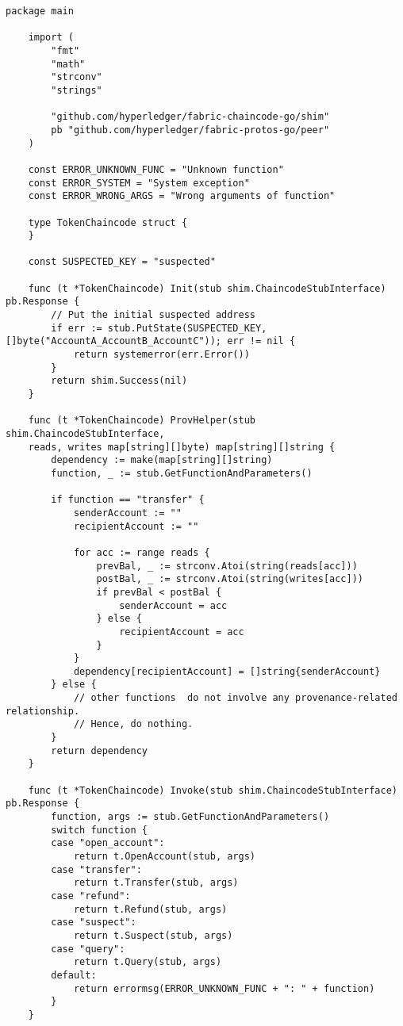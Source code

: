 \begin{lstlisting}
package main

    import (
        "fmt"
        "math"
        "strconv"
        "strings"
    
        "github.com/hyperledger/fabric-chaincode-go/shim"
        pb "github.com/hyperledger/fabric-protos-go/peer"
    )
    
    const ERROR_UNKNOWN_FUNC = "Unknown function"
    const ERROR_SYSTEM = "System exception"
    const ERROR_WRONG_ARGS = "Wrong arguments of function"
    
    type TokenChaincode struct {
    }
    
    const SUSPECTED_KEY = "suspected"
    
    func (t *TokenChaincode) Init(stub shim.ChaincodeStubInterface) pb.Response {
        // Put the initial suspected address
        if err := stub.PutState(SUSPECTED_KEY, []byte("AccountA_AccountB_AccountC")); err != nil {
            return systemerror(err.Error())
        }
        return shim.Success(nil)
    }
    
    func (t *TokenChaincode) ProvHelper(stub shim.ChaincodeStubInterface, 
    reads, writes map[string][]byte) map[string][]string {
        dependency := make(map[string][]string)
        function, _ := stub.GetFunctionAndParameters()
    
        if function == "transfer" {
            senderAccount := ""
            recipientAccount := ""
    
            for acc := range reads {
                prevBal, _ := strconv.Atoi(string(reads[acc]))
                postBal, _ := strconv.Atoi(string(writes[acc]))
                if prevBal < postBal {
                    senderAccount = acc
                } else {
                    recipientAccount = acc
                }
            }
            dependency[recipientAccount] = []string{senderAccount}
        } else {
            // other functions  do not involve any provenance-related relationship.
            // Hence, do nothing.
        }
        return dependency
    }
    
    func (t *TokenChaincode) Invoke(stub shim.ChaincodeStubInterface) pb.Response {
        function, args := stub.GetFunctionAndParameters()
        switch function {
        case "open_account":
            return t.OpenAccount(stub, args)
        case "transfer":
            return t.Transfer(stub, args)
        case "refund":
            return t.Refund(stub, args)
        case "suspect":
            return t.Suspect(stub, args)
        case "query":
            return t.Query(stub, args)
        default:
            return errormsg(ERROR_UNKNOWN_FUNC + ": " + function)
        }
    }
    

\end{lstlisting}
